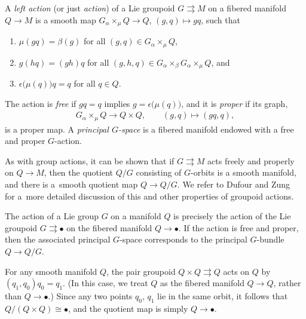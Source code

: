 \documentclass[pdftex]{sigma}
\numberwithin{equation}{section}
\begin{document}
\begin{Definition} \label{def:groupoidAction}
A \emph{left action} (or just \emph{action}) of a Lie groupoid $ G \rightrightarrows M $ on a f\/ibered manifold $ Q \rightarrow M $ is a smooth map $ G \mathbin{ _\alpha \times _\mu } Q \rightarrow Q $, $ ( g, q ) \mapsto g q $, such that
 \begin{enumerate}[label=(\roman*)]\itemsep=0pt
 \item $ \mu ( g q ) = \beta (g) $ for all $ ( g, q ) \in G \mathbin{ _\alpha \times _\mu } Q $,
 \item $ g ( h q ) = ( g h ) q $ for all $ ( g, h , q ) \in G \mathbin{ _\alpha \times _\beta } G \mathbin{ _\alpha \times _\mu } Q $, and
 \item $ \epsilon \bigl( \mu (q) \bigr) q = q $ for all $ q \in Q $.
 \end{enumerate}
 The action is \emph{free} if $ g q = q $ implies $ g = \epsilon \bigl( \mu (q) \bigr) $, and it is \emph{proper} if its graph,
 \begin{gather*}
 G \mathbin{ _\alpha \times _\mu } Q \rightarrow Q \times Q , \qquad ( g, q ) \mapsto ( g q, q ) ,
 \end{gather*}
is a proper map. A \emph{principal $G$-space} is a f\/ibered manifold endowed with a free and proper $G$-action.
\end{Definition}

\begin{Remark} \label{rmk:freeProperQuotient}
As with group actions, it can be shown that if $G \rightrightarrows M $ acts freely and properly on $Q \rightarrow M $, then the quotient $ Q / G $ consisting of $G$-orbits is a smooth manifold, and there is a~smooth quotient map $ Q \rightarrow Q / G $. We refer to Dufour and Zung~\cite[Chapter~7]{DuZu2005} for a~more detailed discussion of this and other properties of groupoid actions.
\end{Remark}

\begin{Example} \label{ex:groupAction}The action of a Lie group $G$ on a manifold $Q$ is precisely the action of the Lie groupoid $ G \rightrightarrows \bullet $ on the f\/ibered manifold $ Q \rightarrow \bullet $. If the action is free and proper, then the associated principal $G$-space corresponds to the principal $G$-bundle $Q \rightarrow Q /G$.
\end{Example}

\begin{Example} \label{ex:pairAction}
For any smooth manifold $Q$, the pair groupoid $ Q \times Q \rightrightarrows Q $ acts on $Q$ by $ ( q _1 , q _0 ) q _0 = q _1 $. (In this case, we treat $Q$ as the f\/ibered manifold $ Q \rightarrow Q $, rather than $ Q \rightarrow \bullet $.) Since any two points $ q _0$, $q _1 $ lie in the same orbit, it follows that $ Q / ( Q \times Q ) \cong \bullet $, and the quotient map is simply $ Q \rightarrow \bullet $.
\end{Example}
\end{document}
